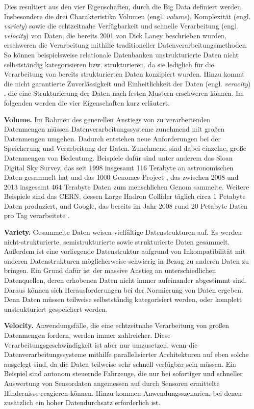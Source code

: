 Dies resultiert aus den vier Eigenschaften, durch die Big Data definiert werden. Insbesondere die drei Charakteristika Volumen (engl. \textit{volume}), Komplexität (engl. \textit{variety}) sowie die echtzeitnahe Verfügbarkeit und schnelle Verarbeitung (engl. \textit{velocity}) von Daten, die bereits 2001 von Dick Laney \cite{Laney2001} beschrieben wurden, erschweren die Verarbeitung mithilfe traditioneller Datenverarbeitungsmethoden. So können beispielsweise relationale Datenbanken unstrukturierte Daten nicht selbstständig kategorisieren bzw. strukturieren, da sie lediglich für die Verarbeitung von bereits strukturierten Daten konzipiert wurden. Hinzu kommt die nicht garantierte Zuverlässigkeit und Einheitlichkeit der Daten (engl. \textit{veracity}) \cite{Zikopoulos2012}, die eine Strukturierung der Daten nach festen Mustern erschweren können. Im folgenden werden die vier Eigenschaften kurz erläutert.

\textbf{Volume.} Im Rahmen des generellen Anstiegs von zu verarbeitenden Datenmengen müssen Datenverarbeitungssysteme zunehmend mit großen Datenmengen umgehen. Dadurch entstehen neue Anforderungen bei der Speicherung und Verarbeitung der Daten. 
Zunehmend sind dabei einzelne, große Datenmengen von Bedeutung. Beispiele dafür sind unter anderem das Sloan Digital Sky Survey, das seit 1998 insgesamt 116 Terabyte an astronomischen Daten gesammelt hat \cite{York2000, Alam2015} und das 1000 Genomes Project \cite{Baker2010}, das zwischen 2008 und 2013 insgesamt 464 Terabyte Daten zum menschlichen Genom sammelte. Weitere Beispiele sind das CERN, dessen Large Hadron Collider täglich circa 1 Petabyte Daten produziert, und Google, das bereits im Jahr 2008 rund 20 Petabyte Daten pro Tag verarbeitete \cite{Dean2008}.

\textbf{Variety.} Gesammelte Daten weisen vielfältige Datenstrukturen auf. Es werden nicht-strukturierte, semistrukturierte sowie strukturierte Daten gesammelt. Außerdem ist eine vorliegende Datenstruktur aufgrund von Inkompatibilität mit anderen Datenstrukturen möglicherweise schwierig in Bezug zu anderen Daten zu bringen. Ein Grund dafür ist der massive Anstieg an unterschiedlichen Datenquellen, deren erhobenen Daten nicht immer aufeinander abgestimmt sind. Daraus können sich Herausforderungen bei der Normierung von Daten ergeben. Denn Daten müssen teilweise selbstständig kategorisiert werden, oder komplett unstrukturiert gespeichert werden.

\textbf{Velocity.} Anwendungsfälle, die eine echtzeitnahe Verarbeitung von großen Datenmengen fordern, werden immer zahlreicher. Diese Verarbeitungsgeschwindigkeit ist aber nur umzusetzen, wenn die Datenverarbeitungssysteme mithilfe parallelisierter Architekturen auf eben solche ausgelegt sind, da die Daten teilweise sehr schnell verfügbar sein müssen. Ein Beispiel sind autonom steuernde Fahrzeuge, die nur bei sofortiger und schneller Auswertung von Sensordaten angemessen auf durch Sensoren ermittelte Hindernisse reagieren können. Hinzu kommen Anwendungsszenarien, bei denen zusätzlich ein hoher Datendurchsatz erforderlich ist. 

